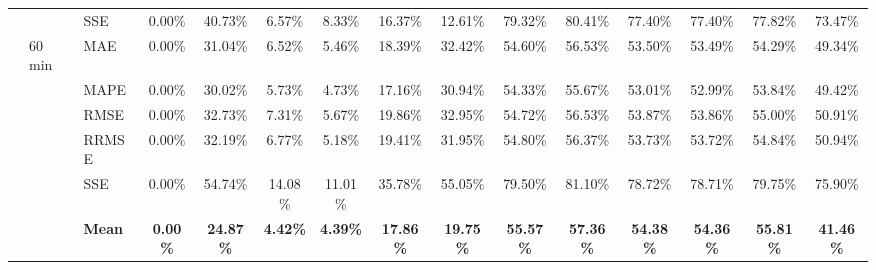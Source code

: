 {\begin{longtable}[htb!]{lllcccccccccccc}
{} &  & {SSE} & {0.00\%} & {40.73\%} & {6.57\%} & {8.33\%} & {16.37\%} & {12.61\%} & {79.32\%} & {80.41\%} & {77.40\%} & {77.40\%} & {77.82\%} & {73.47\%} \\
{} & {60 min} & {MAE} & {0.00\%} & {31.04\%} & {6.52\%} & {5.46\%} & {18.39\%} & {32.42\%} & {54.60\%} & {56.53\%} & {53.50\%} & {53.49\%} & {54.29\%} & {49.34\%} \\
{} & {} & {MAPE} & {0.00\%} & {30.02\%} & {5.73\%} & {4.73\%} & {17.16\%} & {30.94\%} & {54.33\%} & {55.67\%} & {53.01\%} & {52.99\%} & {53.84\%} & {49.42\%} \\
{} & {} & {RMSE} & {0.00\%} & {32.73\%} & {7.31\%} & {5.67\%} & {19.86\%} & {32.95\%} & {54.72\%} & {56.53\%} & {53.87\%} & {53.86\%} & {55.00\%} & {50.91\%} \\
{} & {} & {RRMSE} & {0.00\%} & {32.19\%} & {6.77\%} & {5.18\%} & {19.41\%} & {31.95\%} & {54.80\%} & {56.37\%} & {53.73\%} & {53.72\%} & {54.84\%} & {50.94\%} \\
&  & {SSE} & {0.00\%} & {54.74\%} & {14.08\%} & {11.01\%} & {35.78\%} & {55.05\%} & {79.50\%} & {81.10\%} & {78.72\%} & {78.71\%} & {79.75\%} & {75.90\%} \\ \hline
 &  & {\textbf{Mean}} & {\textbf{0.00\%}} & {\textbf{24.87\%}} & {\textbf{4.42\%}} & {\textbf{4.39\%}} & {\textbf{17.86\%}} & {\textbf{19.75\%}} & {\textbf{55.57\%}} & {\textbf{57.36\%}} & {\textbf{54.38\%}} & {\textbf{54.36\%}} & {\textbf{55.81\%}} & {\textbf{41.46\%}}
\end{longtable}
}

